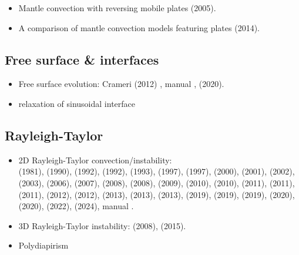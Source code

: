 \begin{itemize}
\item Mantle convection with reversing mobile plates \cite{kogk05} (2005).

\item A comparison of mantle convection models featuring plates \cite{stlh14} (2014).

\end{itemize}

\subsection{Free surface \& interfaces}

\begin{itemize}

\item Free surface evolution: Crameri \etal (2012) \cite{crsg12}, 
      \aspect{} manual \cite{aspectmanual}, \textcite{sctc20} (2020).

\item relaxation of sinusoidal interface \cite{crsg12,robh17}

\end{itemize}


\subsection{Rayleigh-Taylor}

\begin{itemize}
\item 2D Rayleigh-Taylor convection/instability:\\ 
      \textcite{pros81} (1981),
      \textcite{trab90} (1990),
      \textcite{wesc92} (1992),
      \textcite{popo92} (1992),
      \textcite{ogaw93} (1993),
      \textcite{como97} (1997),
      \textcite{vaks97} (1997),
      \textcite{devv00a} (2000),
      \textcite{soga01} (2001),
      \textcite{bast02} (2002),
      \textcite{taki03} (2003),
      \textcite{bomh06} (2006),
      \textcite{dadh07} (2007),
      \textcite{basd08} (2008),
      \textcite{deka08} (2008),
      \textcite{qurj09} (2009),
      \textcite{saev10} (2010),
      \textcite{sunh10} (2010),
      \textcite{lezh11} (2011),
      \textcite{thie11} (2011),
      \textcite{mishin11} (2011), 
      \textcite{lomw12} (2012), 
      \textcite{maie12} (2012),
      \textcite{fusc13} (2013), 
      \textcite{vyrc13} (2013), 
      \textcite{chtl13} (2013),
      \textcite{ropu19} (2019),
      \textcite{robe19} (2019), 
      \textcite{demh19} (2019),
      \textcite{logb20} (2020),
      \textcite{sctc20} (2020),
      \textcite{mivg22} (2022),
      \textcite{buoa24} (2024),
      \aspect manual \cite{aspectmanual}.

\item 3D Rayleigh-Taylor instability:
      \textcite{fukk08} (2008),
      \textcite{vosc15} (2015).

\item Polydiapirism \cite{wesc92,aspectmanual}

\end{itemize}

